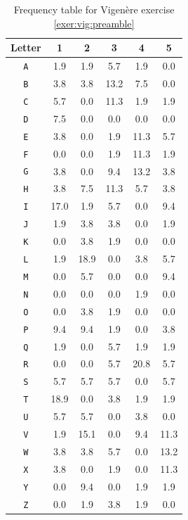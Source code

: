 \documentclass{book}
\theoremstyle{plain}
\theoremstyle{definition}
\newcommand{\ciphertext}[1]{\texttt{#1}} %
\begin{document}
\begin{table}[H]
\begin{center}
\begin{tabular}{c|ccccc}
Letter & 1 & 2 & 3 & 4 & 5 \\
\hline
\ciphertext{A} & 1.9 & 1.9 & 5.7 & 1.9 & 0.0 \\
\ciphertext{B} & 3.8 & 3.8 & 13.2 & 7.5 & 0.0 \\
\ciphertext{C} & 5.7 & 0.0 & 11.3 & 1.9 & 1.9 \\
\ciphertext{D} & 7.5 & 0.0 & 0.0 & 0.0 & 0.0 \\
\ciphertext{E} & 3.8 & 0.0 & 1.9 & 11.3 & 5.7 \\
\ciphertext{F} & 0.0 & 0.0 & 1.9 & 11.3 & 1.9 \\
\ciphertext{G} & 3.8 & 0.0 & 9.4 & 13.2 & 3.8 \\
\ciphertext{H} & 3.8 & 7.5 & 11.3 & 5.7 & 3.8 \\
\ciphertext{I} & 17.0 & 1.9 & 5.7 & 0.0 & 9.4 \\
\ciphertext{J} & 1.9 & 3.8 & 3.8 & 0.0 & 1.9 \\
\ciphertext{K} & 0.0 & 3.8 & 1.9 & 0.0 & 0.0 \\
\ciphertext{L} & 1.9 & 18.9 & 0.0 & 3.8 & 5.7 \\
\ciphertext{M} & 0.0 & 5.7 & 0.0 & 0.0 & 9.4 \\
\ciphertext{N} & 0.0 & 0.0 & 0.0 & 1.9 & 0.0 \\
\ciphertext{O} & 0.0 & 3.8 & 1.9 & 0.0 & 0.0 \\
\ciphertext{P} & 9.4 & 9.4 & 1.9 & 0.0 & 3.8 \\
\ciphertext{Q} & 1.9 & 0.0 & 5.7 & 1.9 & 1.9 \\
\ciphertext{R} & 0.0 & 0.0 & 5.7 & 20.8 & 5.7 \\
\ciphertext{S} & 5.7 & 5.7 & 5.7 & 0.0 & 5.7 \\
\ciphertext{T} & 18.9 & 0.0 & 3.8 & 1.9 & 1.9 \\
\ciphertext{U} & 5.7 & 5.7 & 0.0 & 3.8 & 0.0 \\
\ciphertext{V} & 1.9 & 15.1 & 0.0 & 9.4 & 11.3 \\
\ciphertext{W} & 3.8 & 3.8 & 5.7 & 0.0 & 13.2 \\
\ciphertext{X} & 3.8 & 0.0 & 1.9 & 0.0 & 11.3 \\
\ciphertext{Y} & 0.0 & 9.4 & 0.0 & 1.9 & 1.9 \\
\ciphertext{Z} & 0.0 & 1.9 & 3.8 & 1.9 & 0.0
\end{tabular}
\caption{Frequency table for Vigen\`{e}re exercise \ref{exer:vig:preamble}}
\label{app:vig:preamble}
\end{center}
\end{table}
\end{document}
